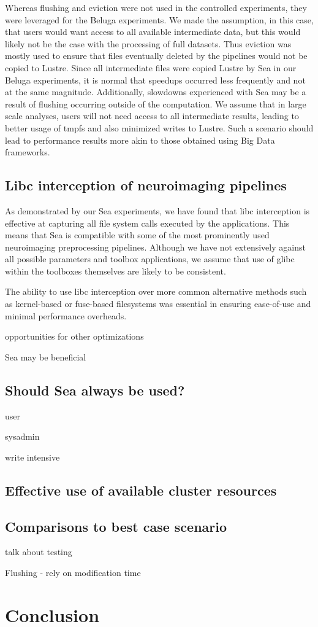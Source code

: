     Whereas flushing and eviction were not used in the controlled experiments,
    they were leveraged for the Beluga experiments. We made the assumption, in
    this case, that users would want access to all available intermediate data,
    but this would likely not be the case with the processing of full datasets.
    Thus eviction was mostly used to ensure that files eventually deleted by the
    pipelines would not be copied to Lustre. Since all intermediate files were
    copied Lustre by Sea in our Beluga experiments, it is normal that speedups
    occurred less frequently and not at the same magnitude. Additionally, slowdowns
    experienced with Sea may be a result of flushing occurring outside of the computation.
    We assume that in large scale analyses, users will not need access to all intermediate
    results, leading to better usage of tmpfs and also minimized writes to Lustre. Such a
    scenario should lead to performance results more akin to those obtained using Big Data
    frameworks.

    \subsection{Libc interception of neuroimaging pipelines}
    
    As demonstrated by our Sea experiments, we have found that libc interception
    is effective at capturing all file system calls executed by the
    applications. This means that Sea is compatible with some of the  most prominently
    used neuroimaging preprocessing pipelines. Although we have not extensively
    against all possible parameters and toolbox applications, we assume that use
    of glibc within the toolboxes themselves are likely to be consistent.
    
    The ability to use libc interception over more common alternative methods
    such as kernel-based or fuse-based filesystems was essential in ensuring
    ease-of-use and minimal performance overheads. 
    
    opportunities for other optimizations
    
    Sea may be beneficial
    \subsection{Should Sea always be used?}
    
    user
    
    sysadmin
    
    write intensive
    
    
    
    \subsection{Effective use of available cluster resources}
    \subsection{Comparisons to best case scenario}
    
    talk about testing
    
    
    Flushing - rely on modification time
    \section{Conclusion}